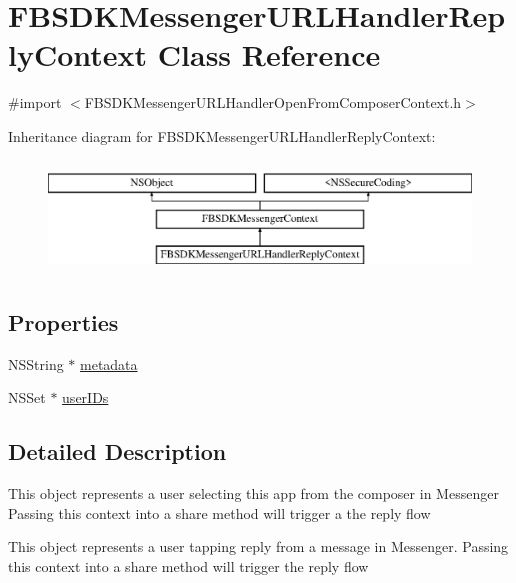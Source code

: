 \hypertarget{interface_f_b_s_d_k_messenger_u_r_l_handler_reply_context}{}\section{F\+B\+S\+D\+K\+Messenger\+U\+R\+L\+Handler\+Reply\+Context Class Reference}
\label{interface_f_b_s_d_k_messenger_u_r_l_handler_reply_context}


{\ttfamily \#import $<$F\+B\+S\+D\+K\+Messenger\+U\+R\+L\+Handler\+Open\+From\+Composer\+Context.\+h$>$}

Inheritance diagram for F\+B\+S\+D\+K\+Messenger\+U\+R\+L\+Handler\+Reply\+Context\+:\begin{figure}[H]
\begin{center}
\leavevmode
\includegraphics[height=3.000000cm]{interface_f_b_s_d_k_messenger_u_r_l_handler_reply_context}
\end{center}
\end{figure}
\subsection*{Properties}
\begin{DoxyCompactItemize}
\item 
N\+S\+String $\ast$ \hyperlink{interface_f_b_s_d_k_messenger_u_r_l_handler_reply_context_a6c5f74a436e2dbf6443853c9a64b725f}{metadata}
\item 
N\+S\+Set $\ast$ \hyperlink{interface_f_b_s_d_k_messenger_u_r_l_handler_reply_context_ad90f842303b7d910f85ab8996294c011}{user\+I\+Ds}
\end{DoxyCompactItemize}


\subsection{Detailed Description}
This object represents a user selecting this app from the composer in Messenger Passing this context into a share method will trigger a the reply flow

This object represents a user tapping reply from a message in Messenger. Passing this context into a share method will trigger the reply flow 

